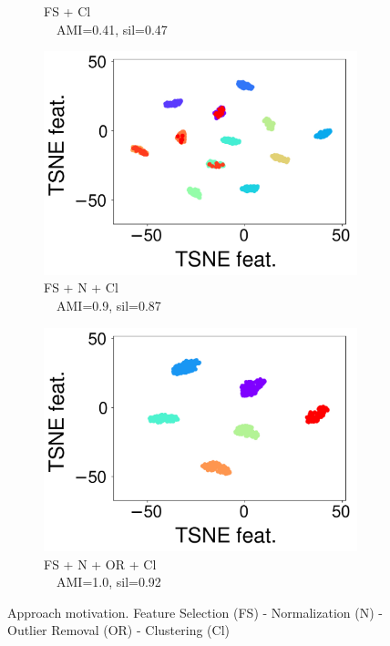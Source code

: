 \begin{figure}
\begin{subfigure}[b]{0.23\columnwidth}
        \caption{FS + Cl\\$\quad$AMI=0.41, sil=0.47}
        \label{clustering-fig:ca4}
    \end{subfigure}
    \hfill
    \begin{subfigure}[b]{0.2\columnwidth}
        \centering
        \includegraphics[scale=.15]{chapters/data-centric/unsupervised/img/ft_sc_cl.pdf}
        \caption{FS + N + Cl\\$\quad$AMI=0.9, sil=0.87}
        \label{clustering-fig:ca5}
    \end{subfigure}
    \hfill
    \begin{subfigure}[b]{0.28\columnwidth}
        \centering
        \includegraphics[scale=.15]{chapters/data-centric/unsupervised/img/ft_sc_ou_cl.pdf}
        \caption{FS + N + OR + Cl\\$\quad$AMI=1.0, sil=0.92}
        \label{clustering-fig:ca6}
    \end{subfigure}
    \caption{Approach motivation.
    \small{Feature Selection (FS) - Normalization (N) - Outlier Removal (OR) - Clustering (Cl)}}
    \label{clustering-fig:clusterings}
\end{figure}

